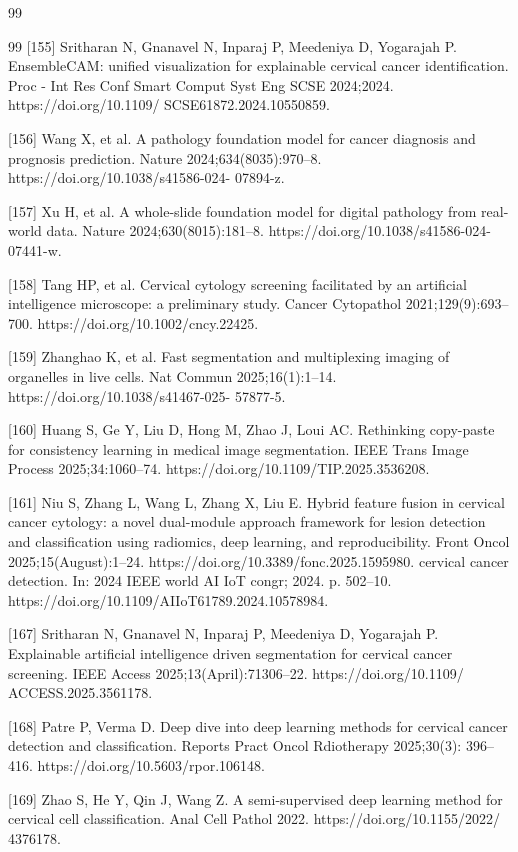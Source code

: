 \documentclass{svjour3}
\begin{document}
\begin{thebibliography}{99}
\begin{thebibliography}{99}
 [155] Sritharan N, Gnanavel N, Inparaj P, Meedeniya D, Yogarajah P. EnsembleCAM: unified visualization for explainable cervical cancer identification. Proc - Int Res Conf Smart Comput Syst Eng SCSE 2024;2024. https://doi.org/10.1109/ SCSE61872.2024.10550859.

 [156] Wang X, et al. A pathology foundation model for cancer diagnosis and prognosis prediction. Nature 2024;634(8035):970–8. https://doi.org/10.1038/s41586-024- 07894-z.

 [157] Xu H, et al. A whole-slide foundation model for digital pathology from real-world data. Nature 2024;630(8015):181–8. https://doi.org/10.1038/s41586-024- 07441-w.

 [158] Tang HP, et al. Cervical cytology screening facilitated by an artificial intelligence microscope: a preliminary study. Cancer Cytopathol 2021;129(9):693–700. https://doi.org/10.1002/cncy.22425.

 [159] Zhanghao K, et al. Fast segmentation and multiplexing imaging of organelles in live cells. Nat Commun 2025;16(1):1–14. https://doi.org/10.1038/s41467-025- 57877-5.

 [160] Huang S, Ge Y, Liu D, Hong M, Zhao J, Loui AC. Rethinking copy-paste for consistency learning in medical image segmentation. IEEE Trans Image Process 2025;34:1060–74. https://doi.org/10.1109/TIP.2025.3536208.

 [161] Niu S, Zhang L, Wang L, Zhang X, Liu E. Hybrid feature fusion in cervical cancer cytology: a novel dual-module approach framework for lesion detection and classification using radiomics, deep learning, and reproducibility. Front Oncol 2025;15(August):1–24. https://doi.org/10.3389/fonc.2025.1595980. cervical cancer detection. In: 2024 IEEE world AI IoT congr; 2024. p. 502–10. https://doi.org/10.1109/AIIoT61789.2024.10578984.

 [167] Sritharan N, Gnanavel N, Inparaj P, Meedeniya D, Yogarajah P. Explainable artificial intelligence driven segmentation for cervical cancer screening. IEEE Access 2025;13(April):71306–22. https://doi.org/10.1109/ ACCESS.2025.3561178.

 [168] Patre P, Verma D. Deep dive into deep learning methods for cervical cancer detection and classification. Reports Pract Oncol Rdiotherapy 2025;30(3): 396–416. https://doi.org/10.5603/rpor.106148.

 [169] Zhao S, He Y, Qin J, Wang Z. A semi-supervised deep learning method for cervical cell classification. Anal Cell Pathol 2022. https://doi.org/10.1155/2022/ 4376178.


\end{thebibliography}
\end{thebibliography}
\end{document}
